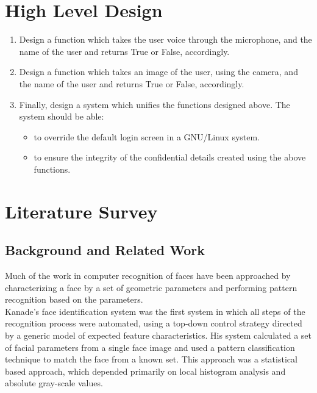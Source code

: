 \documentclass[conference]{IEEEtran}
\begin{document}
\section{High Level Design}
\begin{enumerate}
  \item Design a function which takes the user voice through the microphone,
        and the name of the user and returns True or False, accordingly.
  \item Design a function which takes an image of the user, using the camera,
        and the name of the user and returns True or False, accordingly.
  \item Finally, design a system which unifies the functions designed above.
        The system should be able:
        \begin{itemize}
          \item to override the default login screen in a GNU/Linux system.
          \item to ensure the integrity of the confidential details created
                using the above functions.
        \end{itemize}
\end{enumerate}

\section{Literature Survey}

\subsection{Background and Related Work}
Much of the work in computer recognition of faces have been approached by
characterizing a face by a set of geometric parameters and performing pattern
recognition based on the parameters. \\
Kanade's face identification system \cite{Kanade1973} was the first system in which all
steps of the recognition process were automated, using a top-down control strategy
directed by a generic model of expected feature characteristics. His system calculated
a set of facial parameters from a single face image and used a pattern classification
technique to match the face from a known set. This approach was a statistical
based approach, which depended primarily on local histogram analysis and absolute
gray-scale values. \\
\end{document}
